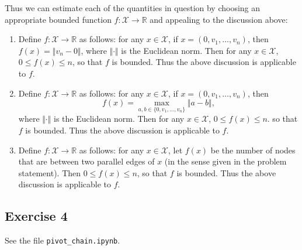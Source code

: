 \documentclass[12pt]{article}
\begin{document}
Thus we can estimate each of the quantities in question by choosing an appropriate bounded function $f : \mathcal{X} \to \mathbb{R}$ and appealing to the discussion above:

\begin{enumerate}[label=(\alph*)]
\item
Define $f : \mathcal{X} \to \mathbb{R}$ as follows: for any $x \in \mathcal{X}$, if $x = (0, v_1, \ldots, v_n)$, then $f(x) = \Vert v_n - 0 \Vert$, where $\Vert \cdot \Vert$ is the Euclidean norm. Then for any $x \in \mathcal{X}$, $0 \leq f(x) \leq n$, so that $f$ is bounded. Thus the above discussion is applicable to $f$.

\item
Define $f : \mathcal{X} \to \mathbb{R}$ as follows: for any $x \in \mathcal{X}$, if $x = (0, v_1, \ldots, v_n)$, then
\begin{equation*}
f(x) = \max_{a, b \in \{0, v_1, \ldots, v_n\}} \Vert a - b \Vert,
\end{equation*}
where $\Vert \cdot \Vert$ is the Euclidean norm. Then for any $x \in \mathcal{X}$, $0 \leq f(x) \leq n$. so that $f$ is bounded. Thus the above discussion is applicable to $f$.

\item
Define $f : \mathcal{X} \to \mathbb{R}$ as follows: for any $x \in \mathcal{X}$, let $f(x)$ be the number of nodes that are between two parallel edges of $x$ (in the sense given in the problem statement). Then $0 \leq f(x) \leq n$, so that $f$ is bounded. Thus the above discussion is applicable to $f$.

\end{enumerate}

\subsection*{Exercise 4}

See the file \texttt{pivot\_chain.ipynb}.
\end{document}

